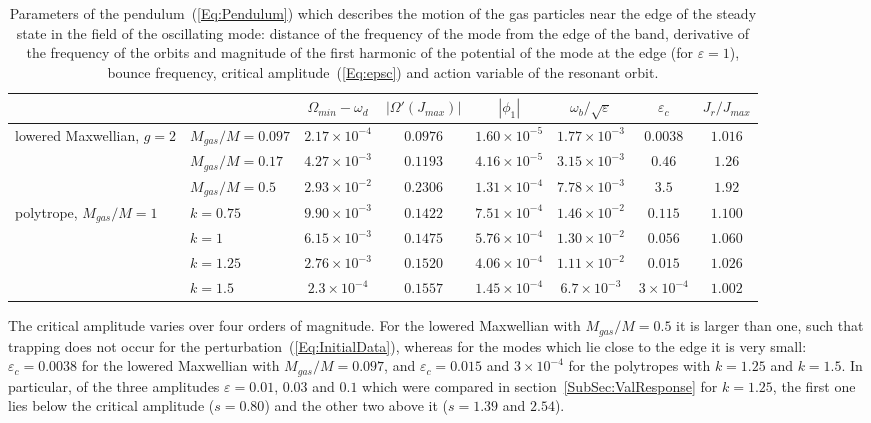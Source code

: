 \begin{table}[htp]
\begin{center}
\begin{tabular}{ll|cccc|cc}
\hline\hline
 & & $\Omega_{min} - \omega_d$ & $|\Omega'(J_{max})|$ & $|\phi_1|$ & $\omega_b/\sqrt{\varepsilon}$ & $\varepsilon_c$ & $J_r/J_{max}$ \\
\hline
lowered Maxwellian, $g = 2$ & $M_{gas}/M = 0.097$ & $2.17\times 10^{-4}$ & $0.0976$ & $1.60\times 10^{-5}$ & $1.77\times 10^{-3}$ & $0.0038$ & $1.016$ \\
 & $M_{gas}/M = 0.17$ & $4.27\times 10^{-3}$ & $0.1193$ & $4.16\times 10^{-5}$ & $3.15\times 10^{-3}$ & $0.46$ & $1.26$ \\
 & $M_{gas}/M = 0.5$ & $2.93\times 10^{-2}$ & $0.2306$ & $1.31\times 10^{-4}$ & $7.78\times 10^{-3}$ & $3.5$ & $1.92$ \\
\hline
polytrope, $M_{gas}/M = 1$ & $k = 0.75$ & $9.90\times 10^{-3}$ & $0.1422$ & $7.51\times 10^{-4}$ & $1.46\times 10^{-2}$ & $0.115$ & $1.100$ \\
 & $k = 1$ & $6.15\times 10^{-3}$ & $0.1475$ & $5.76\times 10^{-4}$ & $1.30\times 10^{-2}$ & $0.056$ & $1.060$ \\
 & $k = 1.25$ & $2.76\times 10^{-3}$ & $0.1520$ & $4.06\times 10^{-4}$ & $1.11\times 10^{-2}$ & $0.015$ & $1.026$ \\
 & $k = 1.5$ & $2.3\times 10^{-4}$ & $0.1557$ & $1.45\times 10^{-4}$ & $6.7\times 10^{-3}$ & $3\times 10^{-4}$ & $1.002$ \\
\hline\hline
\end{tabular}
\end{center}
\caption{Parameters of the pendulum~(\ref{Eq:Pendulum}) which describes the motion of the gas particles near the edge of the steady state in the field of the oscillating mode: distance of the frequency of the mode from the edge of the band, derivative of the frequency of the orbits and magnitude of the first harmonic of the potential of the mode at the edge (for $\varepsilon = 1$), bounce frequency, critical amplitude~(\ref{Eq:epsc}) and action variable of the resonant orbit.}
\label{Tab:Pendulum}
\end{table}

The critical amplitude varies over four orders of magnitude. For the lowered Maxwellian with $M_{gas}/M = 0.5$ it is larger than one, such that trapping does not occur for the perturbation~(\ref{Eq:InitialData}), whereas for the modes which lie close to the edge it is very small: $\varepsilon_c = 0.0038$ for the lowered Maxwellian with $M_{gas}/M = 0.097$, and $\varepsilon_c = 0.015$ and $3\times 10^{-4}$ for the polytropes with $k = 1.25$ and $k = 1.5$. In particular, of the three amplitudes $\varepsilon = 0.01$, $0.03$ and $0.1$ which were compared in section~\ref{SubSec:ValResponse} for $k = 1.25$, the first one lies below the critical amplitude ($s = 0.80$) and the other two above it ($s = 1.39$ and $2.54$).

